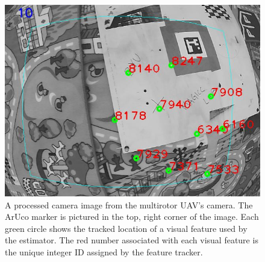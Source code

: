 \begin{figure}
  \centering
  \includegraphics[scale=0.5]{imgs/features_with_aruco.png}
  \caption[Visual Feature Tracking During Flight Experiment]{A processed camera image from the multirotor UAV's camera. The ArUco
  marker is pictured in the top, right corner of the image. Each green
circle shows the tracked location of a visual feature used by the
estimator. The red number associated with each visual feature is the unique
integer ID assigned by the feature tracker.}
  \label{fig:features_with_aruco}
\end{figure}
